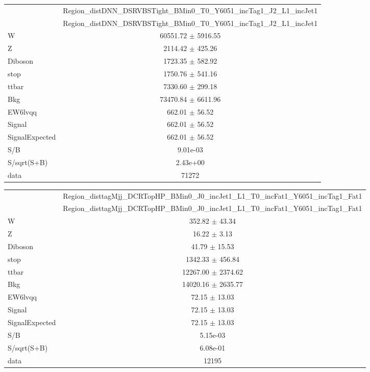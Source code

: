 \documentclass{article}
\begin{document}
\begin{table}
\centering
\small
\begin{tabular}{l|c|}
\cline{2-2}
 & \multicolumn{1}{c|}{Region\_distDNN\_DSRVBSTight\_BMin0\_T0\_Y6051\_incTag1\_J2\_L1\_incJet1}\\
\cline{2-2}
 & \multicolumn{1}{c|}{Region\_distDNN\_DSRVBSTight\_BMin0\_T0\_Y6051\_incTag1\_J2\_L1\_incJet1}\\ \hline
W & 60551.72 $\pm$ 5916.55\\
Z & 2114.42 $\pm$ 425.26\\
Diboson & 1723.35 $\pm$ 582.92\\
stop & 1750.76 $\pm$ 541.16\\
ttbar & 7330.60 $\pm$ 299.18\\
\hline
Bkg & 73470.84 $\pm$ 6611.96\\
\hline
EW6lvqq & 662.01 $\pm$ 56.52\\
\hline
Signal & 662.01 $\pm$ 56.52\\
SignalExpected & 662.01 $\pm$ 56.52\\
\hline
S/B & 9.01e-03\\
S/sqrt(S+B) & 2.43e+00\\
\hline
data & 71272\\ \hline
\end{tabular}
\end{table}


\begin{table}
\centering
\small
\begin{tabular}{l|c|}
\cline{2-2}
 & \multicolumn{1}{c|}{Region\_disttagMjj\_DCRTopHP\_BMin0\_J0\_incJet1\_L1\_T0\_incFat1\_Y6051\_incTag1\_Fat1}\\
\cline{2-2}
 & \multicolumn{1}{c|}{Region\_disttagMjj\_DCRTopHP\_BMin0\_J0\_incJet1\_L1\_T0\_incFat1\_Y6051\_incTag1\_Fat1}\\ \hline
W & 352.82 $\pm$ 43.34\\
Z & 16.22 $\pm$ 3.13\\
Diboson & 41.79 $\pm$ 15.53\\
stop & 1342.33 $\pm$ 456.84\\
ttbar & 12267.00 $\pm$ 2374.62\\
\hline
Bkg & 14020.16 $\pm$ 2635.77\\
\hline
EW6lvqq & 72.15 $\pm$ 13.03\\
\hline
Signal & 72.15 $\pm$ 13.03\\
SignalExpected & 72.15 $\pm$ 13.03\\
\hline
S/B & 5.15e-03\\
S/sqrt(S+B) & 6.08e-01\\
\hline
data & 12195\\ \hline
\end{tabular}
\end{table}
\end{document}

